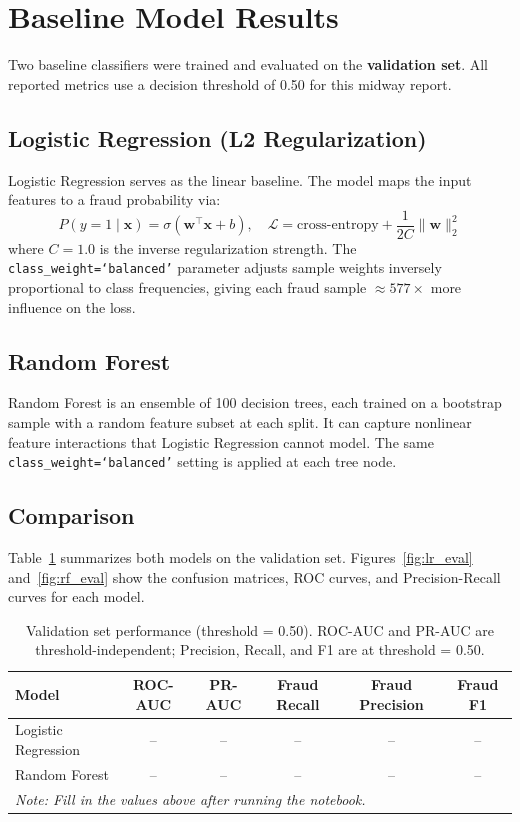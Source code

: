 \documentclass[11pt, a4paper]{article}
\begin{document}
\section{Baseline Model Results}

Two baseline classifiers were trained and evaluated on the \textbf{validation set}.
All reported metrics use a decision threshold of 0.50 for this midway report.

\subsection{Logistic Regression (L2 Regularization)}

Logistic Regression serves as the linear baseline. The model maps the input features
to a fraud probability via:
\[
P(y=1 \mid \mathbf{x}) = \sigma\!\left(\mathbf{w}^\top \mathbf{x} + b\right),
\quad
\mathcal{L} = \text{cross-entropy} + \frac{1}{2C}\|\mathbf{w}\|_2^2
\]
where $C = 1.0$ is the inverse regularization strength. The \texttt{class\_weight=`balanced'}
parameter adjusts sample weights inversely proportional to class frequencies, giving each
fraud sample $\approx 577\times$ more influence on the loss.

\subsection{Random Forest}

Random Forest is an ensemble of 100 decision trees, each trained on a bootstrap sample
with a random feature subset at each split. It can capture nonlinear feature interactions
that Logistic Regression cannot model. The same \texttt{class\_weight=`balanced'} setting
is applied at each tree node.

\subsection{Comparison}

Table~\ref{tab:results} summarizes both models on the validation set.
Figures~\ref{fig:lr_eval} and~\ref{fig:rf_eval} show the confusion matrices, ROC curves,
and Precision-Recall curves for each model.

\begin{table}[h]
    \centering
    \caption{Validation set performance (threshold = 0.50). ROC-AUC and PR-AUC are
             threshold-independent; Precision, Recall, and F1 are at threshold = 0.50.}
    \label{tab:results}
    \begin{tabular}{lccccc}
        \toprule
        \textbf{Model} & \textbf{ROC-AUC} & \textbf{PR-AUC} & \textbf{Fraud Recall} & \textbf{Fraud Precision} & \textbf{Fraud F1} \\
        \midrule
        Logistic Regression & -- & -- & -- & -- & -- \\
        Random Forest       & -- & -- & -- & -- & -- \\
        \bottomrule
        \multicolumn{6}{l}{\small\textit{Note: Fill in the values above after running the notebook.}} \\
    \end{tabular}
\end{table}
\end{document}
